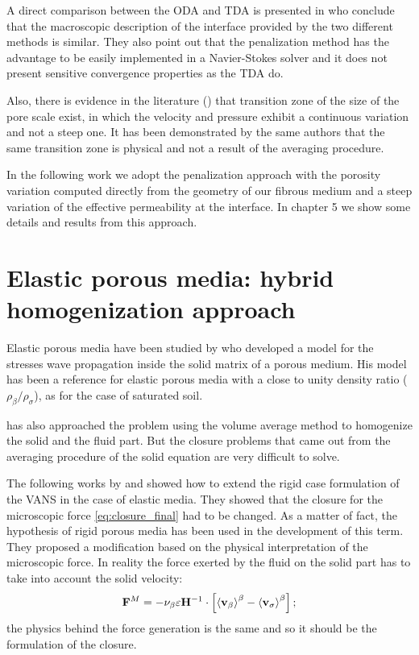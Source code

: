 A direct comparison between the ODA and TDA is presented in \citet{cimolin2013navier} who conclude that the macroscopic description of the interface provided by the two different methods is similar. They also point out that the penalization method has the advantage to be easily implemented in a Navier-Stokes solver and it does not present sensitive convergence properties as the TDA do.

Also, there is evidence in the literature (\citet{ochoa2017fluid}) that transition zone of the size of the pore scale exist, in which the velocity and pressure exhibit a continuous variation and not a steep one. It has been demonstrated by the same authors that the same transition zone is physical and not a result of the averaging procedure.

In the following work we adopt the penalization approach with the porosity variation computed directly from the geometry of our fibrous medium and a steep variation of the effective permeability at the interface. In chapter 5 we show some details and results from this approach.


\section{Elastic porous media: hybrid homogenization approach}
\label{ph:moving}

Elastic porous media have been studied by \citet{biot1956theory} who developed a model for the stresses wave propagation inside the solid matrix of a porous medium.
His model has been a reference for elastic porous media with a close to unity density ratio ($\rho_{\beta}/\rho_{\sigma}$), as for the case of saturated soil.

\citet{whitaker1986deformable} has also approached the problem using the volume average method to homogenize the solid and the fluid part.
But the closure problems that came out from the averaging procedure of the solid equation are very difficult to solve. 

The following works by \citet{hussong2011continuum} and \citet{wang2015volume} showed how to extend the rigid case formulation of the VANS in the case of elastic media.
They showed that the closure for the microscopic force \eqref{eq:closure_final} had to be changed. As a matter of fact, the hypothesis of rigid porous media has been used in the development of this term.
They proposed a modification based on the physical interpretation of the microscopic force. In reality the force exerted by the fluid on the solid part has to take into account the solid velocity:
$$
\mathbf{F}^M = - \nu_{\beta} \varepsilon \mathbf{H}^{-1} \cdot \left[ {\left< \textbf{v}_{\beta} \right>}^{\beta} - {\left< \textbf{v}_{\sigma} \right>}^{\beta} \right];
$$
the physics behind the force generation is the same and so it should be the formulation of the closure.

